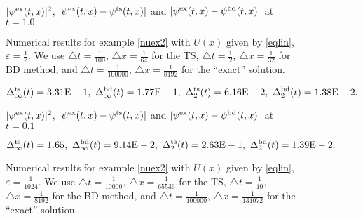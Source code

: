 \documentclass[leqno,final]{siamltex}
\numberwithin{equation}{section}
\newcounter{me}
\begin{document}
\begin{figure} \footnotesize
\begin{center}

$|\psi^{\rm ex}(t,x)|^2$, $|\psi^{\rm ex}(t,x)-\psi^{\rm
ts}(t,x)|$ and $|\psi^{\rm ex}(t,x)-\psi^{\rm bd}(t,x)|$ at
$t=1.0$\vspace{-1mm} \caption{Numerical results for example
\ref{nuex2} with $U(x)$ given by \eqref{eqlin}, ${{\varepsilon }}={\frac{{1}}{{2}}}$. We
use ${\triangle} t={\frac{{1}}{{100}}}$, ${\triangle} x={\frac{{1}}{{64}}}$ for the TS, ${\triangle}
t={\frac{{1}}{{2}}}$, ${\triangle} x={\frac{{1}}{{32}}}$ for BD method, and ${\triangle}
t={\frac{{1}}{{100000}}}$, ${\triangle} x={\frac{{1}}{{8192}}}$ for the ``exact'' solution.
\vspace{-3mm}}\label{fig27}
\[\Delta^{\rm ts}_\infty(t)=3.31{\rm{E}}-1,\
\Delta^{\rm bd}_\infty(t)=1.77{\rm{E}}-1,\
\Delta^{\rm ts}_2(t)=6.16{\rm{E}}-2,\
\Delta^{\rm bd}_2(t)=1.38{\rm{E}}-2.\]\vspace{1mm}

\resizebox{1.5in}{!}{\texttt{[image: 2la\_sp.eps]}}

$|\psi^{\rm ex}(t,x)|^2$, $|\psi^{\rm ex}(t,x)-\psi^{\rm ts}(t,x)|$
and $|\psi^{\rm ex}(t,x)-\psi^{\rm bd}(t,x)|$ at $t=0.1$\vspace{-1mm}
\end{center}
\caption{Numerical results for example \ref{nuex2} with $U(x)$
given by \eqref{eqlin}, ${{\varepsilon }}={\frac{{1}}{{1024}}}$. We use ${\triangle}
t={\frac{{1}}{{10000}}}$, ${\triangle} x={\frac{{1}}{{65536}}}$ for the TS, ${\triangle}
t={\frac{{1}}{{10}}}$, ${\triangle} x={\frac{{1}}{{8192}}}$ for the BD method, and ${\triangle}
t={\frac{{1}}{{100000}}}$, ${\triangle} x={\frac{{1}}{{131072}}}$ for the ``exact''
solution. }\label{fig29}\vspace{-3mm}
\[\Delta^{\rm ts}_\infty(t)=1.65,\
\Delta^{\rm bd}_\infty(t)=9.14{\rm{E}}-2,\
\Delta^{\rm ts}_2(t)=2.63{\rm{E}}-1,\
\Delta^{\rm bd}_2(t)=1.39{\rm{E}}-2.\]
\end{figure}
\end{document}
